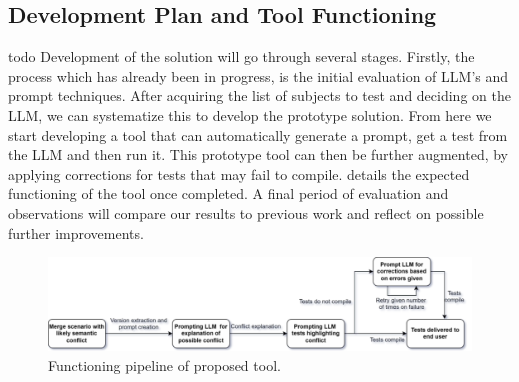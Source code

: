 \subsection{Development Plan and Tool Functioning}
todo{
Development of the solution will go through several stages. Firstly, the process which has already been in progress, is the initial evaluation of LLM's and prompt techniques. After acquiring the list of subjects to test and deciding on the LLM, we can systematize this to develop the prototype solution. From here we start developing a tool that can automatically generate a prompt, get a test from the LLM and then run it. This prototype tool can then be further augmented, by applying corrections for tests that may fail to compile.  details the expected functioning of the tool once completed. A final period of evaluation and observations will compare our results to previous work and reflect on possible further improvements.
}
\begin{figure}
    \centering
    \includegraphics[width=1\linewidth]{figures/tool.pdf}
    \caption{Functioning pipeline of proposed tool.}
    \label{fig:tool}
\end{figure}